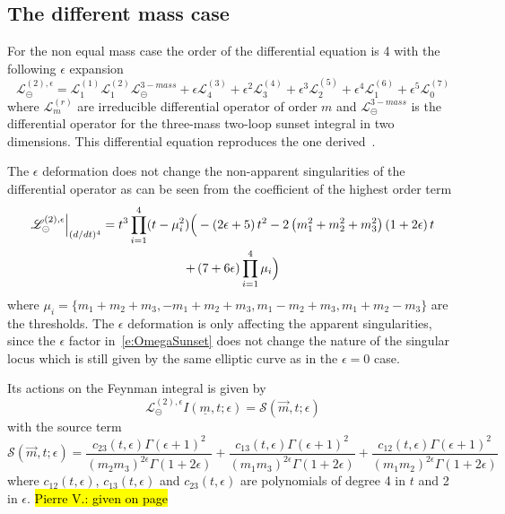 \documentclass[a4paper,12pt]{article}
\numberwithin{equation}{section}
\numberwithin{figure}{subsection}
\theoremstyle{plain}
\theoremstyle{plain}
\theoremstyle{definition}
\theoremstyle{plain}
\theoremstyle{remark}
\theoremstyle{plain}
\def\su{\circleddash}
\newcommand{\pvnote}[1]{\sethlcolor{bubblegum} \protect\hl{Pierre V.: #1} \sethlcolor{yellow}}
\begin{document}
\subsection{The different mass case}\label{sec:2sunset3mass}

For the non equal mass case the order of the differential equation is
4 with the following $\epsilon$ expansion
\begin{equation}
     \mathscr{L}^{(2),\epsilon}_\su =   \mathscr{L}^{(1)}_1
     \mathscr{L}^{(2)}_1    \mathscr{L}^{3-mass}_\su +\epsilon
     \mathscr{L}^{(3)}_4+\epsilon^2  \mathscr{L}^{(4)}_3+\epsilon^3
     \mathscr{L}^{(5)}_2+ \epsilon^4 \mathscr{L}^{(6)}_1 +\epsilon^5
    \mathscr{L}^{(7)}_0
   \end{equation} 
   where $ \mathscr{L}^{(r)}_m$  are irreducible differential operator
   of  order $m$ and $\mathscr{L}^{3-mass}_\su$ is the differential
   operator for the three-mass two-loop sunset integral in two
   dimensions. This differential equation reproduces the one 
   derived~\cite{Remiddi:2013joa,Remiddi:2016gno}.

The $\epsilon$ deformation does not change the non-apparent
singularities of the differential operator as can be seen from the
coefficient of the highest order term
\begin{multline}
  \mathscr{L}^{(2),\epsilon}_\su \Big\vert_{(d/dt)^4}= t^3\prod_{i=1}^4 (t-
  \mu_i^2) \Big(-\left(2 \epsilon +5\right) t^{2}-2
    \left(m_{1}^{2}+m_{2}^{2}+m_{3}^{2}\right) \left(1+2 \epsilon
    \right) t \cr+ \left(7+6 \epsilon \right)\prod_{i=1}^4 \mu_i
\Big)  
\end{multline}
where $\mu_i=\{m_1+m_2+m_3,-m_1+m_2+m_3,m_1-m_2+m_3,m_1+m_2-m_3\}$ are
the thresholds.  The $\epsilon$ deformation is only affecting the
apparent singularities, since the $\epsilon$ factor
in~\eqref{e:OmegaSunset} does not change the nature of the singular
locus which is still given by the same elliptic curve as in the
$\epsilon=0$ case.
   
Its actions on the Feynman integral is given by 
\begin{equation}
     \mathscr{L}^{(2),\epsilon}_\su  I(\underline
     m,t;\epsilon)=\mathscr{S}(\vec m,t;\epsilon) 
   \end{equation}
   with the source term
   \begin{equation}
     \mathscr{S}(\vec m,t;\epsilon)=\frac{c_{23}(t,\epsilon)\Gamma (\epsilon +1)^2}{ (m_{2} m_{3})^{2 \epsilon}\Gamma (1+2\epsilon)}+\frac{c_{13}(t,\epsilon)\Gamma (\epsilon +1)^2}{ (m_{1} m_{3})^{2 \epsilon }\Gamma (1+2
   \epsilon)}+\frac{c_{12}(t,\epsilon)\Gamma (\epsilon +1)^2}{ (m_{1} m_{2})^{2 \epsilon }\Gamma (1+2
   \epsilon )}
\end{equation}
where $c_{12}(t,\epsilon)$, $c_{13}(t,\epsilon)$ and
$c_{23}(t,\epsilon)$ are polynomials of degree 4 in $t$ and 2 in
$\epsilon$. \pvnote{given on page}
\end{document}
